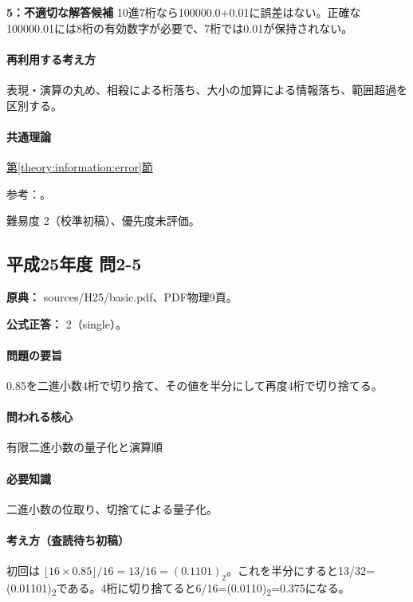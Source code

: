 \noindent\textbf{5：不適切な解答候補} 10進7桁なら100000.0+0.01に誤差はない。正確な100000.01には8桁の有効数字が必要で、7桁では0.01が保持されない。\par

\paragraph{再利用する考え方} 表現・演算の丸め、相殺による桁落ち、大小の加算による情報落ち、範囲超過を区別する。

\paragraph{共通理論} \hyperref[theory:information:error]{第\ref*{theory:information:error}節}

\par 参考：\cite{goldberg1991}。

\par 難易度 2（校準初稿）、優先度未評価。

\subsection{平成25年度 問2-5}
\label{q:h25-reg-basic-2-5}

\noindent\textbf{原典：} sources/H25/basic.pdf、PDF物理9頁。

\textbf{公式正答：} 2（single）。

\paragraph{問題の要旨} 0.85を二進小数4桁で切り捨て、その値を半分にして再度4桁で切り捨てる。

\paragraph{問われる核心} 有限二進小数の量子化と演算順

\paragraph{必要知識} 二進小数の位取り、切捨てによる量子化。

\paragraph{考え方（査読待ち初稿）} 初回は \(\lfloor16\times0.85\rfloor/16=13/16=(0.1101)_2\)。これを半分にすると13/32=\allowbreak{}(0.01101)\textsubscript{2}である。4桁に切り捨てると6/16=\allowbreak{}(0.0110)\textsubscript{2}=0.375になる。

